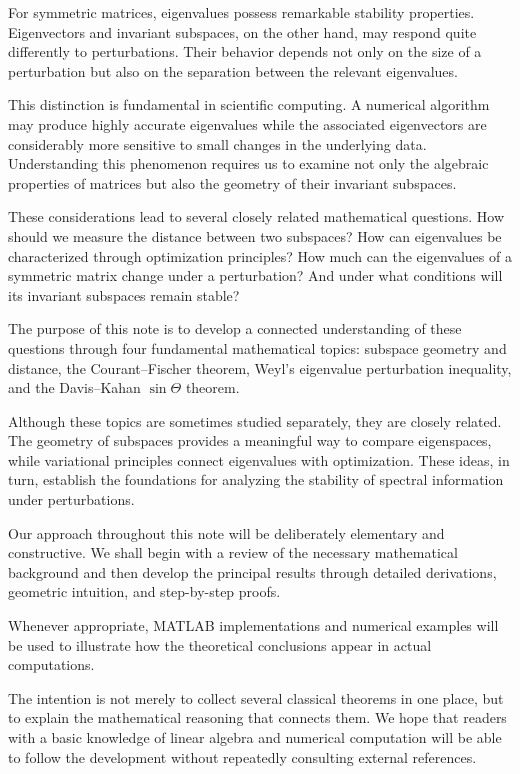 \documentclass[14pt,letterpaper]{article}
\theoremstyle{plain}
\theoremstyle{definition}
\theoremstyle{remark}
\begin{document}
For symmetric matrices, eigenvalues possess
remarkable stability properties. Eigenvectors
and invariant subspaces, on the other hand,
may respond quite differently to perturbations.
Their behavior depends not only on the size
of a perturbation but also on the separation
between the relevant eigenvalues.

This distinction is fundamental in scientific
computing. A numerical algorithm may produce
highly accurate eigenvalues while the associated
eigenvectors are considerably more sensitive
to small changes in the underlying data.
Understanding this phenomenon requires us
to examine not only the algebraic properties
of matrices but also the geometry of their
invariant subspaces.

These considerations lead to several closely
related mathematical questions. How should
we measure the distance between two subspaces?
How can eigenvalues be characterized through
optimization principles? How much can the
eigenvalues of a symmetric matrix change under
a perturbation? And under what conditions
will its invariant subspaces remain stable?

The purpose of this note is to develop a
connected understanding of these questions
through four fundamental mathematical topics:
subspace geometry and distance, the
Courant--Fischer theorem, Weyl's eigenvalue
perturbation inequality, and the
Davis--Kahan $\sin\Theta$ theorem.

Although these topics are sometimes studied
separately, they are closely related.
The geometry of subspaces provides a meaningful
way to compare eigenspaces, while variational
principles connect eigenvalues with optimization.
These ideas, in turn, establish the foundations
for analyzing the stability of spectral
information under perturbations.

Our approach throughout this note will be
deliberately elementary and constructive.
We shall begin with a review of the necessary
mathematical background and then develop
the principal results through detailed
derivations, geometric intuition, and
step-by-step proofs.

Whenever appropriate, MATLAB implementations
and numerical examples will be used to
illustrate how the theoretical conclusions
appear in actual computations.

The intention is not merely to collect
several classical theorems in one place,
but to explain the mathematical reasoning
that connects them. We hope that readers
with a basic knowledge of linear algebra and numerical computation
will be able to follow the development
without repeatedly consulting external
references.
\end{document}
